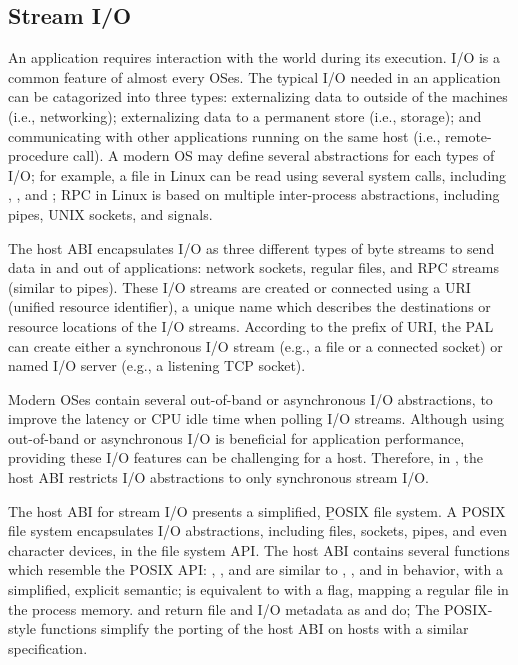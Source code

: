 \subsection{Stream I/O}
\label{sec:abi:streams}



An application requires interaction with the world during its execution.
I/O is a common feature of almost every OSes.
The typical I/O needed in an application
can be catagorized into three types:
externalizing data to outside of the machines (i.e., networking);
externalizing data to a permanent store (i.e., storage);
and communicating with other applications running on the same host (i.e., remote-procedure call).
A modern OS may define several abstractions
for each types of I/O; for example, a file in Linux can be read using several system calls,
including , , and ;
RPC in Linux is based on multiple inter-process abstractions,
including pipes, UNIX sockets, and signals.




The host ABI
encapsulates I/O as three different types of byte streams
to send data in and out of applications:
network sockets, regular files, and RPC streams (similar to pipes).
These I/O streams
are created or connected using a URI (unified resource identifier),
a unique name which describes the destinations or resource locations of the I/O streams.
According to the prefix of URI,
the PAL can create either a synchronous I/O stream (e.g., a file or a connected socket)
or named I/O server (e.g., a listening TCP socket).


Modern OSes contain several out-of-band or asynchronous I/O abstractions, to improve the latency or CPU idle time
when polling I/O streams.
Although using out-of-band or asynchronous I/O is beneficial for application performance,
providing these I/O features can be challenging for a host.
Therefore, in \graphene{}, the host ABI restricts I/O abstractions to only synchronous stream I/O.



The host ABI for stream I/O presents a simplified, {\b POSIX file system}.
A POSIX file system
encapsulates I/O abstractions,
including files, sockets, pipes, and even character devices,
in the file system API.
The host ABI contains several functions
which resemble the POSIX API:
, , and 
are similar to , , and  in behavior, with a simplified, explicit semantic;
 is equivalent to  with a  flag, mapping a regular file in the process memory. %
 and 
return file and I/O metadata
as  and  do;
The POSIX-style functions simplify the porting of the host ABI
on hosts with a similar specification.






